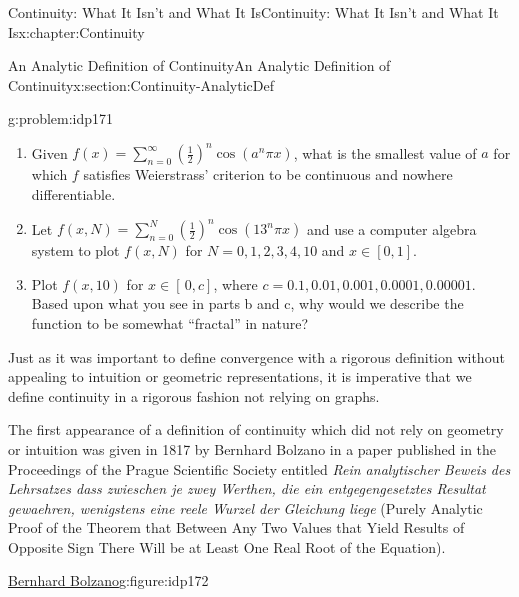 \begin{chapterptx}{Continuity: What It Isn't and What It Is}{}{Continuity: What It Isn't and What It Is}{}{}{x:chapter:Continuity}
\begin{sectionptx}{An Analytic Definition of Continuity}{}{An Analytic Definition of Continuity}{}{}{x:section:Continuity-AnalyticDef}
		\begin{problem}{}{g:problem:idp171}%
			\begin{enumerate}[font=\bfseries,label=(\alph*),ref=\alph*]
				\item{}Given \(f(x)=\sum_{n=0}^\infty\left(\frac{1}{2}\right)^n\cos\left(a^n\pi
				x\right)\), what is the smallest value of \(a\) for which \(f\) satisfies Weierstrass' criterion to be continuous and nowhere differentiable.%
				\item{}Let \(f(x,N)=\sum_{n=0}^N\left(\frac{1}{2}\right)^n\cos\left(13^n\pi
				x\right)\) and use a computer algebra system to plot \(f(x,N)\) for \(N=0,1,2,3,4,10\) and \(x\in[0,1]\).%
				\item{}Plot \(f(x,10)\) for \(x\in[\,0,c]\), where \(c=0.1,0.01,0.001,0.0001,0.00001\).  Based upon what you see in parts b and c, why would we describe the function to be somewhat ``fractal'' in nature?%
			\end{enumerate}
		\end{problem}
		Just as it was important to define convergence with a rigorous definition without appealing to intuition or geometric representations, it is imperative that we define continuity in a rigorous fashion not relying on graphs.%
		\par
		The first appearance of a definition of continuity which did not rely on geometry or intuition was given in 1817 by Bernhard Bolzano  in a paper published in the Proceedings of the Prague Scientific Society entitled \textit{Rein analytischer Beweis des Lehrsatzes dass zwieschen je zwey Werthen, die ein entgegengesetztes Resultat gewaehren, wenigstens eine reele Wurzel der Gleichung liege} (Purely Analytic Proof of the Theorem that Between Any Two Values that Yield Results of Opposite Sign There Will be at Least One Real Root of the Equation).%
		\begin{figureptx}{\href{https://mathshistory.st-andrews.ac.uk/Biographies/Bolzano/}{Bernhard Bolzano}\protect\footnotemark{}}{g:figure:idp172}{}%
			\begin{image}{0.325}{0.35}{0.325}%

\end{image}
\end{figureptx}
\end{sectionptx}
\end{chapterptx}
